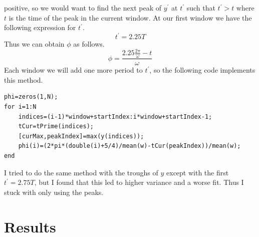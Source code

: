 \documentclass[12pt]{article}
\begin{document}
positive, so we would want to find the next peak of \(y^\prime\) at \(t^\prime\) such
that \(t^\prime>t\) where \(t\) is the time of the peak in the current window. At our first window we have
the following expression for \(t^\prime\).
\[t^\prime = 2.25T\]
Thus we can obtain \(\phi\) as follows.
\[\phi=\frac{2.25\frac{2\pi}{\omega} - t}{\omega}\]
Each window we will add one more period to \(t^\prime\), so the following code implements this method.
\small
\begin{verbatim}
phi=zeros(1,N);
for i=1:N
    indices=(i-1)*window+startIndex:i*window+startIndex-1;
    tCur=tPrime(indices);
    [curMax,peakIndex]=max(y(indices));
    phi(i)=(2*pi*(double(i)+5/4)/mean(w)-tCur(peakIndex))/mean(w);
end
\end{verbatim}
\normalsize
I tried to do the same method with the troughs of \(y\) except with the first \(t^\prime=2.75T\), but I
found that this led to higher variance and a worse fit. Thus I stuck with only using the peaks.

\section{Results}
\end{document}
